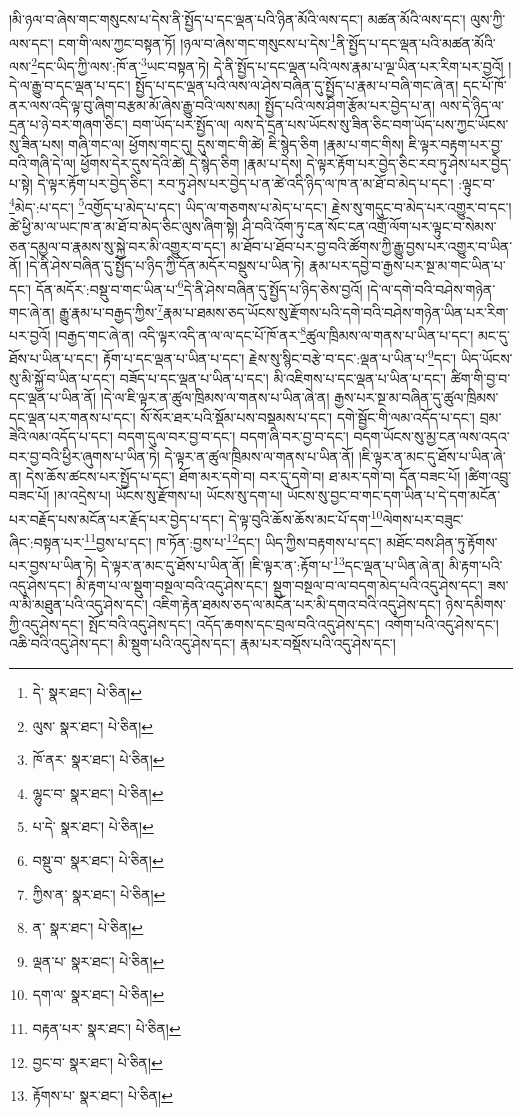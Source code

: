 །མི་ཉལ་བ་ཞེས་གང་གསུངས་པ་དེས་ནི་སྤྱོད་པ་དང་ལྡན་པའི་ཉིན་མོའི་ལས་དང་། མཚན་མོའི་ལས་དང་། ལུས་ཀྱི་ལས་དང་། ངག་གི་ལས་ཀྱང་བསྟན་ཏོ། །ཉལ་བ་ཞེས་གང་གསུངས་པ་དེས་\footnote{དེ་  སྣར་ཐང་།  པེ་ཅིན། }ནི་སྤྱོད་པ་དང་ལྡན་པའི་མཚན་མོའི་ལས་\footnote{ལུས་  སྣར་ཐང་།  པེ་ཅིན། }དང་ཡིད་ཀྱི་ལས་:ཁོ་ན་\footnote{ཁོ་ནར་  སྣར་ཐང་།  པེ་ཅིན། }ཡང་བསྟན་ཏེ། དེ་ནི་སྤྱོད་པ་དང་ལྡན་པའི་ལས་རྣམ་པ་ལྔ་ཡིན་པར་རིག་པར་བྱའོ། །དེ་ལ་རྒྱུ་བ་དང་ལྡན་པ་དང་། སྤྱོད་པ་དང་ལྡན་པའི་ལས་ལ་ཤེས་བཞིན་དུ་སྤྱོད་པ་རྣམ་པ་བཞི་གང་ཞེ་ན། དང་པོ་ཁོ་ནར་ལས་འདི་ལྟ་བུ་ཞིག་བརྩམ་མོ་ཞེས་རྒྱུ་བའི་ལས་སམ། སྤྱོད་པའི་ལས་ཤིག་རྩོམ་པར་བྱེད་པ་ན། ལས་དེ་ཉིད་ལ་དྲན་པ་ཉེ་བར་གཞག་ཅིང་། བག་ཡོད་པར་སྤྱོད་ལ། ལས་དེ་དྲན་པས་ཡོངས་སུ་ཟིན་ཅིང་བག་ཡོད་པས་ཀྱང་ཡོངས་སུ་ཟིན་པས། གཞི་གང་ལ། ཕྱོགས་གང་དུ། དུས་གང་གི་ཚེ། ཇི་སྙེད་ཅིག །རྣམ་པ་གང་གིས། ཇི་ལྟར་བརྟག་པར་བྱ་བའི་གཞི་དེ་ལ། ཕྱོགས་དེར་དུས་དེའི་ཚེ། དེ་སྙེད་ཅིག །རྣམ་པ་དེས། དེ་ལྟར་རྟོག་པར་བྱེད་ཅིང་རབ་ཏུ་ཤེས་པར་བྱེད་པ་སྟེ། དེ་ལྟར་རྟོག་པར་བྱེད་ཅིང་། རབ་ཏུ་ཤེས་པར་བྱེད་པ་ན་ཚེ་འདི་ཉིད་ལ་ཁ་ན་མ་ཐོ་བ་མེད་པ་དང་། :ལྟུང་བ་\footnote{ལྷུང་བ་  སྣར་ཐང་།  པེ་ཅིན། }མེད་:པ་དང་། \footnote{པ་དེ་  སྣར་ཐང་།  པེ་ཅིན། }འགྱོད་པ་མེད་པ་དང་། ཡིད་ལ་གཅགས་པ་མེད་པ་དང་། རྗེས་སུ་གདུང་བ་མེད་པར་འགྱུར་བ་དང་། ཚེ་ཕྱི་མ་ལ་ཡང་ཁ་ན་མ་ཐོ་བ་མེད་ཅིང་ལུས་ཞིག་སྟེ། ཤི་བའི་འོག་ཏུ་ངན་སོང་ངན་འགྲོ་ལོག་པར་ལྟུང་བ་སེམས་ཅན་དམྱལ་བ་རྣམས་སུ་སྐྱེ་བར་མི་འགྱུར་བ་དང་། མ་ཐོབ་པ་ཐོབ་པར་བྱ་བའི་ཚོགས་ཀྱི་རྒྱུ་བྱས་པར་འགྱུར་བ་ཡིན་ནོ། །དེ་ནི་ཤེས་བཞིན་དུ་སྤྱོད་པ་ཉིད་ཀྱི་དོན་མདོར་བསྡུས་པ་ཡིན་ཏེ། རྣམ་པར་དབྱེ་བ་རྒྱས་པར་སྔ་མ་གང་ཡིན་པ་དང་། དོན་མདོར་:བསྡུ་བ་གང་ཡིན་པ་\footnote{བསྡུ་བ་  སྣར་ཐང་།  པེ་ཅིན། }དེ་ནི་ཤེས་བཞིན་དུ་སྤྱོད་པ་ཉིད་ཅེས་བྱའོ། །དེ་ལ་དགེ་བའི་བཤེས་གཉེན་གང་ཞེ་ན། རྒྱུ་རྣམ་པ་བརྒྱད་ཀྱིས་\footnote{ཀྱིས་ན་  སྣར་ཐང་།  པེ་ཅིན། }རྣམ་པ་ཐམས་ཅད་ཡོངས་སུ་རྫོགས་པའི་དགེ་བའི་བཤེས་གཉེན་ཡིན་པར་རིག་པར་བྱའོ། །བརྒྱད་གང་ཞེ་ན། འདི་ལྟར་འདི་ན་ལ་ལ་དང་པོ་ཁོ་ནར་\footnote{ན་  སྣར་ཐང་།  པེ་ཅིན། }ཚུལ་ཁྲིམས་ལ་གནས་པ་ཡིན་པ་དང་། མང་དུ་ཐོས་པ་ཡིན་པ་དང་། རྟོག་པ་དང་ལྡན་པ་ཡིན་པ་དང་། རྗེས་སུ་སྙིང་བརྩེ་བ་དང་:ལྡན་པ་ཡིན་པ་\footnote{ལྡན་པ་  སྣར་ཐང་།  པེ་ཅིན། }དང་། ཡིད་ཡོངས་སུ་མི་སྐྱོ་བ་ཡིན་པ་དང་། བཟོད་པ་དང་ལྡན་པ་ཡིན་པ་དང་། མི་འཇིགས་པ་དང་ལྡན་པ་ཡིན་པ་དང་། ཚིག་གི་བྱ་བ་དང་ལྡན་པ་ཡིན་ནོ། །དེ་ལ་ཇི་ལྟར་ན་ཚུལ་ཁྲིམས་ལ་གནས་པ་ཡིན་ཞེ་ན། རྒྱས་པར་སྔ་མ་བཞིན་དུ་ཚུལ་ཁྲིམས་དང་ལྡན་པར་གནས་པ་དང་། སོ་སོར་ཐར་པའི་སྡོམ་པས་བསྡམས་པ་དང་། དགེ་སྦྱོང་གི་ལམ་འདོད་པ་དང་། བྲམ་ཟེའི་ལམ་འདོད་པ་དང་། བདག་དུལ་བར་བྱ་བ་དང་། བདག་ཞི་བར་བྱ་བ་དང་། བདག་ཡོངས་སུ་མྱ་ངན་ལས་འདའ་བར་བྱ་བའི་ཕྱིར་ཞུགས་པ་ཡིན་ཏེ། དེ་ལྟར་ན་ཚུལ་ཁྲིམས་ལ་གནས་པ་ཡིན་ནོ། །ཇི་ལྟར་ན་མང་དུ་ཐོས་པ་ཡིན་ཞེ་ན། དེས་ཆོས་ཚངས་པར་སྤྱོད་པ་དང་། ཐོག་མར་དགེ་བ། བར་དུ་དགེ་བ། ཐ་མར་དགེ་བ། དོན་བཟང་པོ། །ཚིག་འབྲུ་བཟང་པོ། །མ་འདྲེས་པ། ཡོངས་སུ་རྫོགས་པ། ཡོངས་སུ་དག་པ། ཡོངས་སུ་བྱང་བ་གང་དག་ཡིན་པ་དེ་དག་མངོན་པར་བརྗོད་པས་མངོན་པར་རྗོད་པར་བྱེད་པ་དང་། དེ་ལྟ་བུའི་ཆོས་ཆོས་མང་པོ་དག་\footnote{དག་ལ་  སྣར་ཐང་།  པེ་ཅིན། }ལེགས་པར་བཟུང་ཞིང་:བསྟན་པར་\footnote{བརྟན་པར་  སྣར་ཐང་།  པེ་ཅིན། }བྱས་པ་དང་། ཁ་ཏོན་:བྱས་པ་\footnote{བྱང་བ་  སྣར་ཐང་།  པེ་ཅིན། }དང་། ཡིད་ཀྱིས་བརྟགས་པ་དང་། མཐོང་བས་ཤིན་ཏུ་རྟོགས་པར་བྱས་པ་ཡིན་ཏེ། དེ་ལྟར་ན་མང་དུ་ཐོས་པ་ཡིན་ནོ། །ཇི་ལྟར་ན་:རྟོག་པ་\footnote{རྟོགས་པ་  སྣར་ཐང་།  པེ་ཅིན། }དང་ལྡན་པ་ཡིན་ཞེ་ན། མི་རྟག་པའི་འདུ་ཤེས་དང་། མི་རྟག་པ་ལ་སྡུག་བསྔལ་བའི་འདུ་ཤེས་དང་། སྡུག་བསྔལ་བ་ལ་བདག་མེད་པའི་འདུ་ཤེས་དང་། ཟས་ལ་མི་མཐུན་པའི་འདུ་ཤེས་དང་། འཇིག་རྟེན་ཐམས་ཅད་ལ་མངོན་པར་མི་དགའ་བའི་འདུ་ཤེས་དང་། ཉེས་དམིགས་ཀྱི་འདུ་ཤེས་དང་། སྤོང་བའི་འདུ་ཤེས་དང་། འདོད་ཆགས་དང་བྲལ་བའི་འདུ་ཤེས་དང་། འགོག་པའི་འདུ་ཤེས་དང་། འཆི་བའི་འདུ་ཤེས་དང་། མི་སྡུག་པའི་འདུ་ཤེས་དང་། རྣམ་པར་བསྡོས་པའི་འདུ་ཤེས་དང་། 